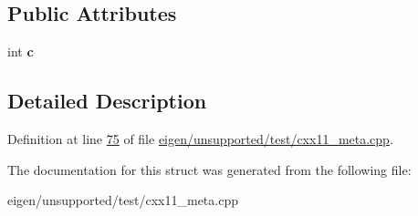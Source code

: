 \subsection*{Public Attributes}
\begin{DoxyCompactItemize}
\item 
\mbox{\label{structdummy__inst_a08c5285c20e8986737cb20e1d02b491d}} 
int {\bfseries c}
\end{DoxyCompactItemize}


\subsection{Detailed Description}


Definition at line \hyperlink{eigen_2unsupported_2test_2cxx11__meta_8cpp_source_l00075}{75} of file \hyperlink{eigen_2unsupported_2test_2cxx11__meta_8cpp_source}{eigen/unsupported/test/cxx11\+\_\+meta.\+cpp}.



The documentation for this struct was generated from the following file\+:\begin{DoxyCompactItemize}
\item 
eigen/unsupported/test/cxx11\+\_\+meta.\+cpp\end{DoxyCompactItemize}
